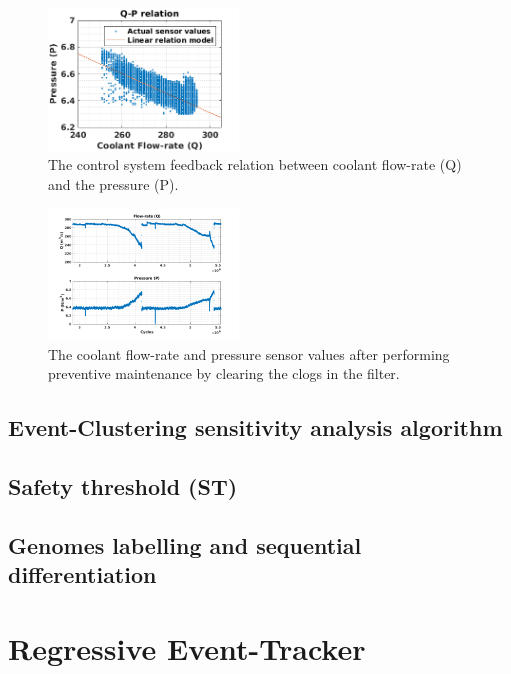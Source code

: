 \documentclass[conference]{IEEEtran}
\begin{document}
\begin{figure}[htbp]
\centerline{\includegraphics[width=0.45\textwidth]{QP_relation.png}}
\caption{The control system feedback relation between coolant flow-rate (Q) and the pressure (P).}
\label{fig:QP_relation}
\end{figure}

\begin{figure}[htbp]
\centerline{\includegraphics[width=0.45\textwidth]{Sensor_values.png}}
\caption{The coolant flow-rate and pressure sensor values after performing preventive maintenance by clearing the clogs in the filter.}
\label{fig:Sensor_values}
\end{figure}

\subsection{Event-Clustering sensitivity analysis algorithm}
\label{subsec:event_clustering}


\subsection{Safety threshold (ST)}
\label{subsec:ST}


\subsection{Genomes labelling and sequential differentiation }
\label{subsec:Genome_labelling}


\section{Regressive Event-Tracker}
\label{sec:RET}
\end{document}
